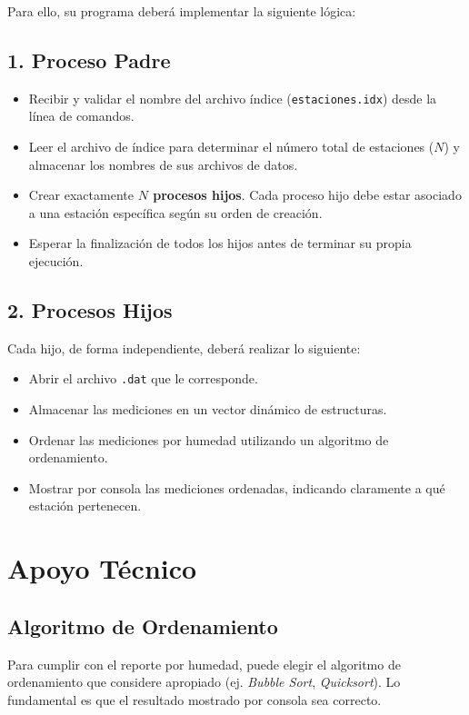 \documentclass[12pt,a4paper]{article}
\begin{document}
\newpage

Para ello, su programa deberá implementar la siguiente lógica:

\subsection*{1. Proceso Padre}
\begin{itemize}
    \item Recibir y validar el nombre del archivo índice (\texttt{estaciones.idx}) desde la línea de comandos.
    \item Leer el archivo de índice para determinar el número total de estaciones ($N$) y almacenar los nombres de sus archivos de datos.
    \item Crear exactamente \textbf{$N$ procesos hijos}. Cada proceso hijo debe estar asociado a una estación específica según su orden de creación.
    \item Esperar la finalización de todos los hijos antes de terminar su propia ejecución.
\end{itemize}

\subsection*{2. Procesos Hijos}
Cada hijo, de forma independiente, deberá realizar lo siguiente:
\begin{itemize}
    \item Abrir el archivo \texttt{.dat} que le corresponde.
    \item Almacenar las mediciones en un vector dinámico de estructuras.
    \item Ordenar las mediciones por humedad utilizando un algoritmo de ordenamiento.
    \item Mostrar por consola las mediciones ordenadas, indicando claramente a qué estación pertenecen.
\end{itemize}

\section*{Apoyo Técnico}

\subsection*{Algoritmo de Ordenamiento}
Para cumplir con el reporte por humedad, puede elegir el algoritmo de ordenamiento que considere apropiado (ej. \textit{Bubble Sort}, \textit{Quicksort}). Lo fundamental es que el resultado mostrado por consola sea correcto.
\end{document}
